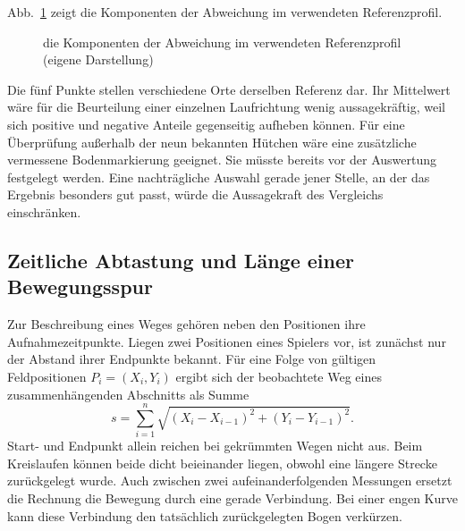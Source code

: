 Abb.~\ref{abb:em-richtung} zeigt die Komponenten der Abweichung im verwendeten Referenzprofil.
\begin{figure}[htbp]\centering
{}
\caption{die Komponenten der Abweichung im verwendeten Referenzprofil (eigene Darstellung)}\label{abb:em-richtung}\end{figure}
Die fünf Punkte stellen verschiedene Orte derselben Referenz dar. Ihr Mittelwert wäre für die Beurteilung einer einzelnen Laufrichtung wenig aussagekräftig, weil sich positive und negative Anteile gegenseitig aufheben können. Für eine Überprüfung außerhalb der neun bekannten Hütchen wäre eine zusätzliche vermessene Bodenmarkierung geeignet. Sie müsste bereits vor der Auswertung festgelegt werden. Eine nachträgliche Auswahl gerade jener Stelle, an der das Ergebnis besonders gut passt, würde die Aussagekraft des Vergleichs einschränken.

\subsection{Zeitliche Abtastung und Länge einer Bewegungsspur}
Zur Beschreibung eines Weges gehören neben den Positionen ihre Aufnahmezeitpunkte. Liegen zwei Positionen eines Spielers vor, ist zunächst nur der Abstand ihrer Endpunkte bekannt. Für eine Folge von gültigen Feldpositionen $P_i=(X_i,Y_i)$ ergibt sich der beobachtete Weg eines zusammenhängenden Abschnitts als Summe
\[
s=\sum_{i=1}^{n}\sqrt{(X_i-X_{i-1})^2+(Y_i-Y_{i-1})^2}.
\]
Start- und Endpunkt allein reichen bei gekrümmten Wegen nicht aus. Beim Kreislaufen können beide dicht beieinander liegen, obwohl eine längere Strecke zurückgelegt wurde. Auch zwischen zwei aufeinanderfolgenden Messungen ersetzt die Rechnung die Bewegung durch eine gerade Verbindung. Bei einer engen Kurve kann diese Verbindung den tatsächlich zurückgelegten Bogen verkürzen.

